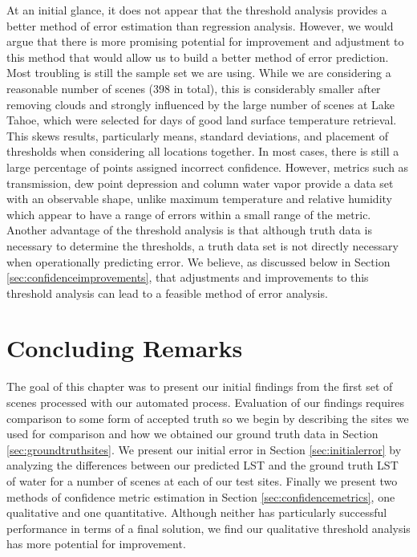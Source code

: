\documentclass{book}
\begin{document}
At an initial glance, it does not appear that the threshold analysis provides a better method of error estimation than regression analysis.  However, we would argue that there is more promising potential for improvement and adjustment to this method that would allow us to build a better method of error prediction.  Most troubling is still the sample set we are using.  While we are considering a reasonable number of scenes (398 in total), this is considerably smaller after removing clouds and strongly influenced by the large number of scenes at Lake Tahoe, which were selected for days of good land surface temperature retrieval.  This skews results, particularly means, standard deviations, and placement of thresholds when considering all locations together.  In most cases, there is still a large percentage of points assigned incorrect confidence.  However, metrics such as transmission, dew point depression and column water vapor provide a data set with an observable shape, unlike maximum temperature and relative humidity which appear to have a range of errors within a small range of the metric.  Another advantage of the threshold analysis is that although truth data is necessary to determine the thresholds, a truth data set is not directly necessary when operationally predicting error.  We believe, as discussed below in Section \ref{sec:confidenceimprovements}, that adjustments and improvements to this threshold analysis can lead to a feasible method of error analysis.

\section{Concluding Remarks}

The goal of this chapter was to present our initial findings from the first set of scenes processed with our automated process.  Evaluation of our findings requires comparison to some form of accepted truth so we begin by describing the sites we used for comparison and how we obtained our ground truth data in Section \ref{sec:groundtruthsites}.  We present our initial error in Section \ref{sec:initialerror} by analyzing the differences between our predicted LST and the ground truth LST of water for a number of scenes at each of our test sites.  Finally we present two methods of confidence metric estimation in Section \ref{sec:confidencemetrics}, one qualitative and one quantitative.  Although neither has particularly successful performance in terms of a final solution, we find our qualitative threshold analysis has more potential for improvement.
\end{document}
